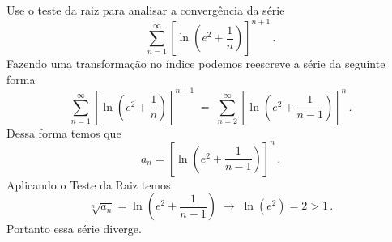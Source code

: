 \begin{example}
  Use o teste da raiz para analisar a convergência da série
  \[
    \sum_{n=1}^\infty \left[\ln\left(e^2+\frac{1}{n}\right)\right]^{n+1}    \,.
  \]
  \solution
  Fazendo uma transformação no índice podemos reescreve a série da seguinte forma
  \[
    \sum_{n=1}^\infty \left[\ln\left(e^2+\frac{1}{n}  \right)\right]^{n+1} \;=\;
    \sum_{n=2}^\infty \left[\ln\left(e^2+\frac{1}{n-1}\right)\right]^{n}   \,.
  \]
  Dessa forma temos que
  \[
    a_n=\left[\ln\left(e^2+\frac{1}{n-1}\right)\right]^{n}   \,.
  \]
  Aplicando o Teste da Raiz temos
  \[
    \sqrt[n]{a_n} = \ln\left(e^2+\frac{1}{n-1}\right)
                  \;\to\; \ln \left(e^2\right)
                  = 2 > 1      \,.
  \]
  Portanto essa série diverge.
\end{example}

